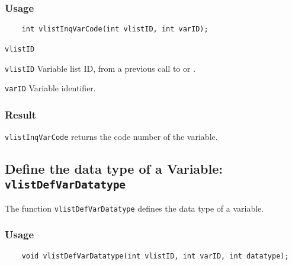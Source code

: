 \subsubsection*{Usage}

\begin{verbatim}
    int vlistInqVarCode(int vlistID, int varID);
\end{verbatim}

\hspace*{4mm}\begin{minipage}[]{15cm}
\begin{deflist}{\texttt{vlistID}\ }
\item[\texttt{vlistID}]
Variable list ID, from a previous call to {} or {}.
\item[\texttt{varID}]
Variable identifier.

\end{deflist}
\end{minipage}

\subsubsection*{Result}

{\texttt{vlistInqVarCode}} returns the code number of the variable.



\subsection{Define the data type of a Variable: \texttt{vlistDefVarDatatype}}
\label{vlistDefVarDatatype}

The function {\texttt{vlistDefVarDatatype}} defines the data type of a variable.

\subsubsection*{Usage}

\begin{verbatim}
    void vlistDefVarDatatype(int vlistID, int varID, int datatype);
\end{verbatim}

